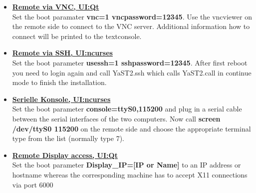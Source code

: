 \begin{itemize}
\item \textbf{\underline{Remote via VNC, UI:Qt}}\\
      Set the boot paramater \textbf{vnc=1 vncpassword=12345}. Use
      the vncviewer on the remote side to connect to the VNC server.
      Additional information how to connect will be printed to the
      textconsole.
\item \textbf{\underline{Remote via SSH, UI:ncurses}}\\
      Set the boot parameter \textbf{usessh=1 sshpassword=12345}.
      After first reboot you need to login again and call
      YaST2.ssh which calls YaST2.call in continue mode to finish the
      installation.
\item \textbf{\underline{Serielle Konsole, UI:ncurses}}\\
	  Set the boot parameter \textbf{console=ttyS0,115200} and plug in a
      serial cable between the serial interfaces of the two computers. Now
      call \textbf{screen /dev/ttyS0 115200} on the remote side and choose
      the appropriate terminal type from the list (normally type 7).
\item \textbf{\underline{Remote Display access, UI:Qt}}\\
      Set the boot parameter \textbf{Display\_IP=[IP or Name]} to an
      IP address or hostname whereas the corresponding machine has to accept
      X11 connections via port 6000
\end{itemize}
